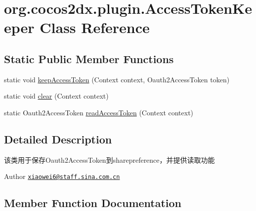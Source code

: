 \hypertarget{classorg_1_1cocos2dx_1_1plugin_1_1AccessTokenKeeper}{}\section{org.\+cocos2dx.\+plugin.\+Access\+Token\+Keeper Class Reference}
\label{classorg_1_1cocos2dx_1_1plugin_1_1AccessTokenKeeper}
\subsection*{Static Public Member Functions}
\begin{DoxyCompactItemize}
\item 
static void \hyperlink{classorg_1_1cocos2dx_1_1plugin_1_1AccessTokenKeeper_a4b1d697c67c96e29672290596f7c97cc}{keep\+Access\+Token} (Context context, Oauth2\+Access\+Token token)
\item 
static void \hyperlink{classorg_1_1cocos2dx_1_1plugin_1_1AccessTokenKeeper_ac8ae02bdce83a9a56f085f4985d3e846}{clear} (Context context)
\item 
static Oauth2\+Access\+Token \hyperlink{classorg_1_1cocos2dx_1_1plugin_1_1AccessTokenKeeper_a9fefc6ea7a1bde602761ac72e6742abb}{read\+Access\+Token} (Context context)
\end{DoxyCompactItemize}


\subsection{Detailed Description}
该类用于保存\+Oauth2\+Access\+Token到sharepreference，并提供读取功能 \begin{DoxyAuthor}{Author}
\href{mailto:xiaowei6@staff.sina.com.cn}{\tt xiaowei6@staff.\+sina.\+com.\+cn} 
\end{DoxyAuthor}


\subsection{Member Function Documentation}
\mbox{\label{classorg_1_1cocos2dx_1_1plugin_1_1AccessTokenKeeper_ac8ae02bdce83a9a56f085f4985d3e846}} 
